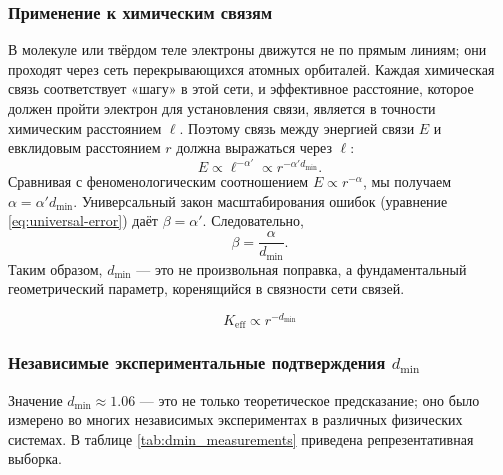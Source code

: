 \documentclass[12pt,a4paper]{article}
\theoremstyle{remark}
\newcommand{\Keff}{K_{\mathrm{eff}}}
\begin{document}
	\subsubsection{Применение к химическим связям}
	
	В молекуле или твёрдом теле электроны движутся не по прямым линиям; они проходят через сеть перекрывающихся атомных орбиталей. Каждая химическая связь соответствует «шагу» в этой сети, и эффективное расстояние, которое должен пройти электрон для установления связи, является в точности химическим расстоянием \(\ell\). Поэтому связь между энергией связи \(E\) и евклидовым расстоянием \(r\) должна выражаться через \(\ell\):
	\begin{equation}
		E \propto \ell^{-\alpha'} \propto r^{-\alpha' d_{\text{min}}}.
		\label{eq:E_through_chemical_distance}
	\end{equation}
	Сравнивая с феноменологическим соотношением \(E \propto r^{-\alpha}\), мы получаем \(\alpha = \alpha' d_{\text{min}}\). Универсальный закон масштабирования ошибок (уравнение \ref{eq:universal-error}) даёт \(\beta = \alpha'\). Следовательно,
	\begin{equation}
		\beta = \frac{\alpha}{d_{\text{min}}}.
		\label{eq:beta_from_alpha}
	\end{equation}
	Таким образом, \(d_{\text{min}}\) — это не произвольная поправка, а фундаментальный геометрический параметр, коренящийся в связности сети связей.
	
	\begin{equation}
		\Keff \propto r^{-d_{\text{min}}}
		\label{eq:keff-scaling}
	\end{equation}
	
	\subsubsection{Независимые экспериментальные подтверждения \(d_{\text{min}}\)}
	
	Значение \(d_{\text{min}} \approx 1.06\) — это не только теоретическое предсказание; оно было измерено во многих независимых экспериментах в различных физических системах. В таблице \ref{tab:dmin_measurements} приведена репрезентативная выборка.
	
\end{document}
